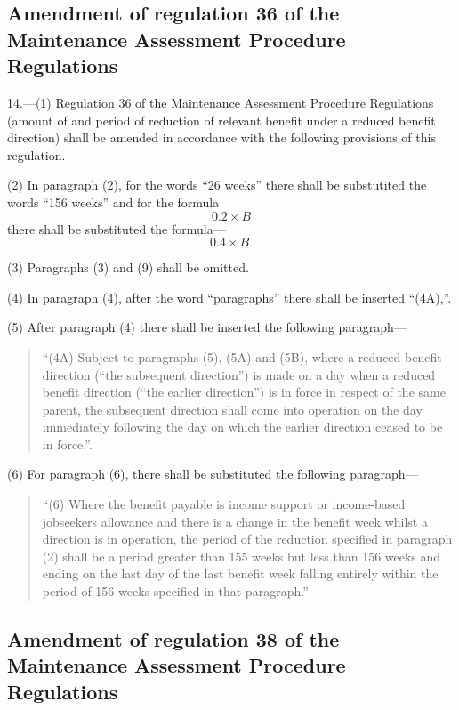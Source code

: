 \documentclass[12pt,a4paper]{article}
\begin{document}
\subsection[14. Amendment of regulation 36 of the Maintenance Assessment Procedure Regulations]{Amendment of regulation 36 of the Maintenance Assessment Procedure Regulations}

14.—(1) Regulation 36 of the Maintenance Assessment Procedure Regulations (amount of and period of reduction of relevant benefit under a reduced benefit direction) shall be amended in accordance with the following provisions of this regulation.

(2) In paragraph (2), for the words “26 weeks” there shall be substutited the words “156 weeks” and for the formula
\[0.2 \times B\] there shall be substituted the formula— \[0.4 \times B.\]

(3) Paragraphs (3) and (9) shall be omitted.

(4) In paragraph (4), after the word “paragraphs” there shall be inserted “(4A),”.

(5) After paragraph (4) there shall be inserted the following paragraph—
\begin{quotation}
“(4A) Subject to paragraphs (5), (5A) and (5B), where a reduced benefit direction (“the subsequent direction”) is made on a day when a reduced benefit direction (“the earlier direction”) is in force in respect of the same parent, the subsequent direction shall come into operation on the day immediately following the day on which the earlier direction ceased to be in force.”.
\end{quotation}

(6) For paragraph (6), there shall be substituted the following paragraph—
\begin{quotation}
“(6) Where the benefit payable is income support or income-based jobseekers allowance and there is a change in the benefit week whilst a direction is in operation, the period of the reduction specified in paragraph (2) shall be a period greater than 155 weeks but less than 156 weeks and ending on the last day of the last benefit week falling entirely within the period of 156 weeks specified in that paragraph.”
\end{quotation}

\subsection[15. Amendment of regulation 38 of the Maintenance Assessment Procedure Regulations]{Amendment of regulation 38 of the Maintenance Assessment Procedure Regulations}
\end{document}

